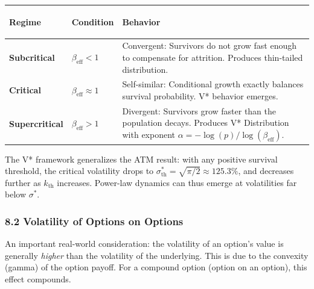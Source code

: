 \documentclass[
  11pt,
  openany]{article}
\newcounter{none} %
\begin{document}
{\def\LTcaptype{none} %
\begin{longtable}[]{@{}
  >{\raggedright\arraybackslash}p{}
  >{\raggedright\arraybackslash}p{}
  >{\raggedright\arraybackslash}p{}@{}}
\toprule\noalign{}
\begin{minipage}[b]{\linewidth}\raggedright
{\bfseries 

Regime

}
\end{minipage} & \begin{minipage}[b]{\linewidth}\raggedright
{\bfseries 

Condition

}
\end{minipage} & \begin{minipage}[b]{\linewidth}\raggedright
{\bfseries 

Behavior

}
\end{minipage} \\
\midrule\noalign{}
\endhead
\bottomrule\noalign{}
\endlastfoot
\textbf{Subcritical} & \(\beta_{\text{eff}} < 1\) & Convergent:
Survivors do not grow fast enough to compensate for attrition. Produces
thin-tailed distribution. \\
\textbf{Critical} & \(\beta_{\text{eff}} \approx 1\) & Self-similar:
Conditional growth exactly balances survival probability. V* behavior
emerges. \\
\textbf{Supercritical} & \(\beta_{\text{eff}} > 1\) & Divergent:
Survivors grow faster than the population decays. Produces V*
Distribution with exponent
\(\alpha = -\log(p)/\log(\beta_{\text{eff}})\). \\
\end{longtable}
}

The V* framework generalizes the ATM result: with any positive survival
threshold, the critical volatility drops to
\(\sigma_{\text{th}}^{*} = \sqrt{\pi/2} \approx 125.3\%\), and decreases
further as \(k_{\text{th}}\) increases. Power-law dynamics can thus
emerge at volatilities far below \(\sigma^*\).

\subsubsection{8.2 Volatility of Options on
Options}\label{volatility-of-options-on-options}

An important real-world consideration: the volatility of an option's
value is generally \emph{higher} than the volatility of the underlying.
This is due to the convexity (gamma) of the option payoff. For a
compound option (option on an option), this effect compounds.
\end{document}
